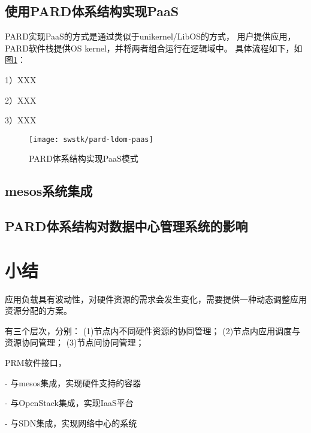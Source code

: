 \subsection{使用PARD体系结构实现PaaS}
PARD实现PaaS的方式是通过类似于unikernel/LibOS的方式，
用户提供应用，PARD软件栈提供OS kernel，并将两者组合运行在逻辑域中。
具体流程如下，如图\ref{fig:pard-ldom-paas}：

1）XXX

2）XXX

3）XXX

\begin{figure}[tb]
  \centering
  \texttt{[image: swstk/pard-ldom-paas]}
  \caption{PARD体系结构实现PaaS模式}
  \label{fig:pard-ldom-paas}
\end{figure}


\subsection{mesos系统集成}



\subsection{PARD体系结构对数据中心管理系统的影响}

\section{小结}


应用负载具有波动性，对硬件资源的需求会发生变化，需要提供一种动态调整应用资源分配的方案。

有三个层次，分别：
(1)节点内不同硬件资源的协同管理；
(2)节点内应用调度与资源协同管理；
(3)节点间协同管理；


PRM软件接口，

- 与mesos集成，实现硬件支持的容器

- 与OpenStack集成，实现IaaS平台

- 与SDN集成，实现网络中心的系统

